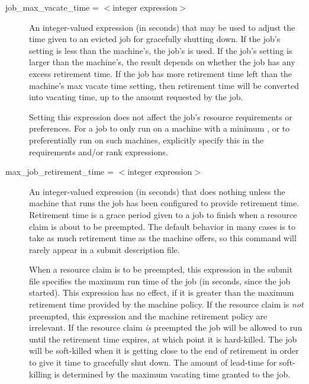 \begin{description}

\label{condor-submit-job-max-vacate-time}
\item[job\_max\_vacate\_time = $<$integer expression$>$]
An integer-valued expression (in seconds) that may be used to adjust
the time given to an evicted job for gracefully shutting down.  If the
job's setting is less than the machine's, the job's is used.  If the
job's setting is larger than the machine's, the result depends on
whether the job has any excess retirement time.  If the job has more
retirement time left than the machine's max vacate time setting, then
retirement time will be converted into vacating time, up to the amount
requested by the job.

Setting this expression does not affect the job's resource
requirements or preferences.  For a job to only run on a machine with
a minimum , or to preferentially run on
such machines, explicitly specify this in the requirements and/or rank
expressions.


\label{condor-submit-max-job-retirement-time}
\item[max\_job\_retirement\_time = $<$integer expression$>$]
An integer-valued expression (in seconds) that
does nothing unless the machine that runs the job has been configured
to provide retirement time.
Retirement time is a
grace period given to a job to finish
when a resource claim is about to be preempted.
The default behavior in many cases is to take as much
retirement time as the machine offers,
so this command will rarely appear in a submit description file.

When a resource claim is to be preempted, this expression in the
submit file specifies the maximum run time of the job (in seconds, since
the job started).
This expression has no effect,
if it is greater than the maximum retirement time provided
by the machine policy.
If the resource claim is \emph{not} preempted,
this expression and the machine retirement policy are irrelevant. 
If the resource claim \emph{is} preempted
the job will be allowed to run until the retirement
time expires, at which point it is hard-killed.
The job will be soft-killed when it is getting close
to the end of retirement in order to give it time
to gracefully shut down.  The amount of lead-time
for soft-killing is determined by the maximum vacating
time granted to the job.


\end{description}
